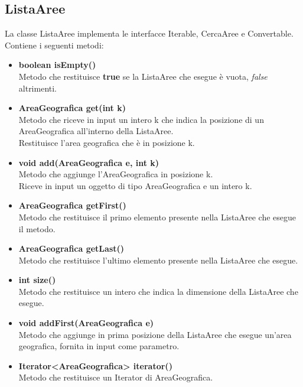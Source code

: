 \documentclass[a4paper, 12pt]{scrreprt}
\begin{document}
			\subsection{ListaAree}
			La classe ListaAree implementa le interfacce Iterable, CercaAree e Convertable. Contiene i seguenti metodi:
			\begin{itemize}
				\item \textbf{boolean isEmpty()}
				\\Metodo che restituisce \textbf{true} se la ListaAree che esegue \`e vuota, \textit{false} altrimenti.
				
				\item \textbf{AreaGeografica get(int k)}
				\\Metodo che riceve in input un intero k che indica la posizione di un AreaGeografica all'interno della ListaAree.
				\\Restituisce l'area geografica che \`e in posizione k.
				
				\item \textbf{void add(AreaGeografica e, int k)}
				\\Metodo che aggiunge l'AreaGeografica in posizione k.
				\\Riceve in input un oggetto di tipo AreaGeografica e un intero k.
				
				\item \textbf{AreaGeografica getFirst()}
				\\Metodo che restituisce il primo elemento presente nella ListaAree che esegue il metodo.
				
				\item \textbf{AreaGeografica getLast()}
				\\Metodo che restituisce l'ultimo elemento presente nella ListaAree che esegue.
				
				\item \textbf{int size()}
				\\Metodo che restituisce un intero che indica la dimensione della ListaAree che esegue.
				
				\item \textbf{void addFirst(AreaGeografica e)}
				\\Metodo che aggiunge in prima posizione della ListaAree che esegue un'area geografica, fornita in input come parametro.
				
				\item \textbf{Iterator<AreaGeografica> iterator()}
				\\Metodo che restituisce un Iterator di AreaGeografica.
				

\end{itemize}
\end{document}
